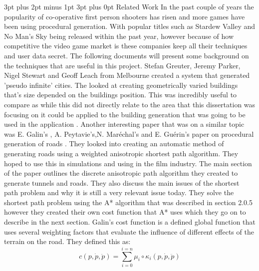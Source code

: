 \documentclass[12pt,a4paper,oneside]{book}
\makeatletter
\renewcommand\subsection{\@startsection {subsection}{1}{2mm} %
                               {3pt plus 2pt minus 1pt} %
                               {3pt plus 0pt} %
                               {\normalfont\bfseries}}
\makeatother
\begin{document}
\subsection{Related Work}
In the past couple of years the popularity of co-operative first person shooters has risen and more games have been using procedural generation. With popular titles such as Stardew Valley and No Man's Sky being released within the past year, however because of how competitive the video game market is these companies keep all their techniques and user data secret. The following documents will present some background on the techniques that are useful in this project.
\vspace{5mm} 
\newline
Stefan Greuter, Jeremy Parker, Nigel Stewart and Geoff Leach from Melbourne created a system that generated 'pseudo infinite' cities. The looked at creating geometrically varied buildings that's size depended on the buildings position. This was incredibly useful to compare as while this did not directly relate to the area that this dissertation was focusing on it could be applied to the building generation that was going to be used in the application \cite{StefanGreut}. 
\vspace{5mm} 
\newline
Another interesting paper that was on a similar topic was E. Galin's , A. Peytavie's,N. Maréchal's and E. Guérin's paper on procedural generation of roads \cite{Roads}. They looked into creating an automatic method of generating roads using a weighted anisotropic shortest path algorithm. They hoped to use this in simulations and using in the film industry. The main section of the paper outlines the discrete anisotropic path algorithm they created to generate tunnels and roads. They also discuss the main issues of the shortest path problem and why it is still a very relevant issue today.  They solve the shortest path problem using the A* algorithm that was described in section 2.0.5 however they created their own cost function that A* uses which they go on to describe in the next section. 
\vspace{5mm} 
\newline
Galin's cost function is a defined global function that uses several weighting factors that evaluate the influence of different effects of the terrain on the road. They defined this as:  
\begin{equation}
c(p,\dot{p}, \ddot{p}) = \displaystyle\sum_{i=0}^{i=n} \mu_i\circ\kappa_i(p,\dot{p}, \ddot{p})
\end{equation} 
\end{document}
